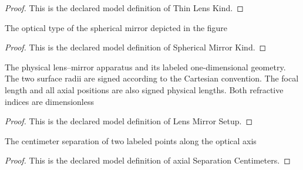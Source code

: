 \begin{proof}
  This is the declared model definition of Thin Lens Kind.
\end{proof}
\begin{definition}
  \label{def:physics:phyx-mini-0035:phyxminiproblems-problemphyxmini0035-sphericalmirrorkind}
  The optical type of the spherical mirror depicted in the figure
\end{definition}
\begin{proof}
  This is the declared model definition of Spherical Mirror Kind.
\end{proof}
\begin{definition}
  \label{def:physics:phyx-mini-0035:phyxminiproblems-problemphyxmini0035-lensmirrorsetup}
  The physical lens--mirror apparatus and its labeled one-dimensional geometry. The two surface radii are signed according to the Cartesian convention. The focal length and all axial positions are also signed physical lengths. Both refractive indices are dimensionless
\end{definition}
\begin{proof}
  This is the declared model definition of Lens Mirror Setup.
\end{proof}
\begin{definition}
  \label{def:physics:phyx-mini-0035:phyxminiproblems-problemphyxmini0035-axialseparationcentimeters}
  The centimeter separation of two labeled points along the optical axis
\end{definition}
\begin{proof}
  This is the declared model definition of axial Separation Centimeters.
\end{proof}
